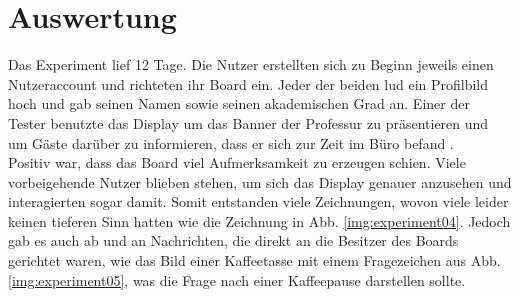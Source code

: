 \section{Auswertung}\label{AuswertungVorstudie}
Das Experiment lief 12 Tage. Die Nutzer erstellten sich zu Beginn jeweils einen Nutzeraccount und richteten ihr Board ein. Jeder der beiden lud ein Profilbild hoch und gab seinen Namen sowie seinen akademischen Grad an.
Einer der Tester benutzte das Display um das Banner der Professur zu präsentieren  und um Gäste \bspw darüber zu informieren, dass er sich zur Zeit im Büro befand .
\\
Positiv war, dass das Board viel Aufmerksamkeit zu erzeugen schien. Viele vorbeigehende Nutzer blieben stehen, um sich das Display genauer anzusehen und interagierten sogar damit. Somit entstanden viele Zeichnungen, wovon viele leider keinen tieferen Sinn hatten wie \bspw die Zeichnung in Abb. \ref{img:experiment04}. Jedoch gab es auch ab und an Nachrichten, die direkt an die Besitzer des Boards gerichtet waren, wie das Bild einer Kaffeetasse mit einem Fragezeichen aus Abb. \ref{img:experiment05}, was die Frage nach einer Kaffeepause darstellen sollte.
